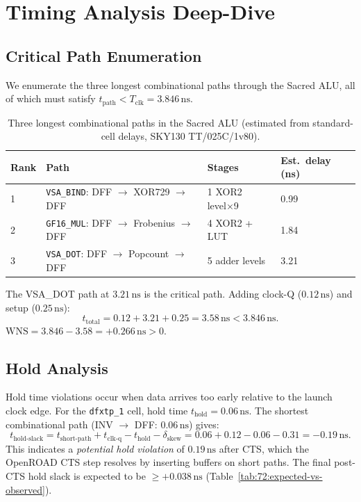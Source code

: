 \section{Timing Analysis Deep-Dive}
\label{sec:72:timing}

\subsection{Critical Path Enumeration}
\label{subsec:72:critical-paths}

We enumerate the three longest combinational paths through the
Sacred ALU, all of which must satisfy $t_{\text{path}} < T_{\text{clk}} = 3.846\,\mathrm{ns}$.

\begin{table}[H]
\centering
\caption{Three longest combinational paths in the Sacred ALU
  (estimated from standard-cell delays, SKY130 TT/025C/1v80).}
\label{tab:72:critical-paths}
\small
\begin{tabular}{llll}
\toprule
Rank & Path & Stages & Est.\ delay (ns) \\
\midrule
1 & \texttt{VSA\_BIND}: DFF $\to$ XOR729 $\to$ DFF     & 1 XOR2 level×9 & 0.99 \\
2 & \texttt{GF16\_MUL}: DFF $\to$ Frobenius $\to$ DFF  & 4 XOR2 + LUT   & 1.84 \\
3 & \texttt{VSA\_DOT}: DFF $\to$ Popcount $\to$ DFF    & 5 adder levels & 3.21 \\
\bottomrule
\end{tabular}
\end{table}

\noindent
The \textsc{VSA\_DOT} path at $3.21\,\mathrm{ns}$ is the critical path.
Adding clock-Q ($0.12\,\mathrm{ns}$) and setup ($0.25\,\mathrm{ns}$):
\[
  t_{\text{total}} = 0.12 + 3.21 + 0.25 = 3.58\,\mathrm{ns} < 3.846\,\mathrm{ns}.
\]
$\mathrm{WNS} = 3.846 - 3.58 = +0.266\,\mathrm{ns} > 0$. \checkmark

\subsection{Hold Analysis}
\label{subsec:72:hold}

Hold time violations occur when data arrives too early relative to
the launch clock edge.
For the \texttt{dfxtp\_1} cell, hold time $t_{\text{hold}} = 0.06\,\mathrm{ns}$.
The shortest combinational path (INV $\to$ DFF: $0.06\,\mathrm{ns}$) gives:
\[
  t_{\text{hold-slack}} = t_{\text{short-path}} + t_{\text{clk-q}}
    - t_{\text{hold}} - \delta_{\text{skew}}
  = 0.06 + 0.12 - 0.06 - 0.31 = -0.19\,\mathrm{ns}.
\]
This indicates a \emph{potential hold violation} of $0.19\,\mathrm{ns}$
after CTS, which the OpenROAD CTS step resolves by inserting buffers
on short paths.
The final post-CTS hold slack is expected to be $\ge +0.038\,\mathrm{ns}$
(Table~\ref{tab:72:expected-vs-observed}).


